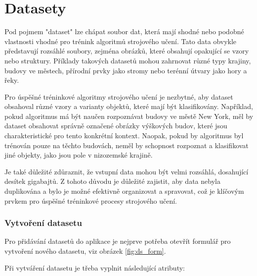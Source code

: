 \section{Datasety}
Pod pojmem "dataset" lze chápat soubor dat, která mají shodné nebo podobné vlastnosti vhodné pro trénink algoritmů strojového učení. Tato data obvykle představují rozsáhlé soubory, zejména obrázků, které obsahují opakující se vzory nebo struktury. Příklady takových datasetů mohou zahrnovat různé typy krajiny, budovy ve městech, přírodní prvky jako stromy nebo terénní útvary jako hory a řeky.

Pro úspěšné tréninkové algoritmy strojového učení je nezbytné, aby dataset obsahoval různé vzory a varianty objektů, které mají být klasifikovány. Například, pokud algoritmus má být naučen rozpoznávat budovy ve městě New York, měl by dataset obsahovat správně označené obrázky výškových budov, které jsou charakteristické pro tento konkrétní kontext. Naopak, pokud by algoritmus byl trénován pouze na těchto budovách, neměl by schopnost rozpoznat a klasifikovat jiné objekty, jako jsou pole v nizozemské krajině.

Je také důležité zdůraznit, že vstupní data mohou být velmi rozsáhlá, dosahující desítek gigabajtů. Z tohoto důvodu je důležité zajistit, aby data nebyla duplikována a bylo je možné efektivně organizovat a spravovat, což je klíčovým prvkem pro úspěšné tréninkové procesy strojového učení.

\subsubsection{Vytvoření datasetu}
Pro přidávání datasetů do aplikace je nejprve potřeba otevřít formulář pro vytvoření nového datasetu, viz obrázek \vref{fig:ds_form}.

Při vytváření datasetu je třeba vyplnit následující atributy:

